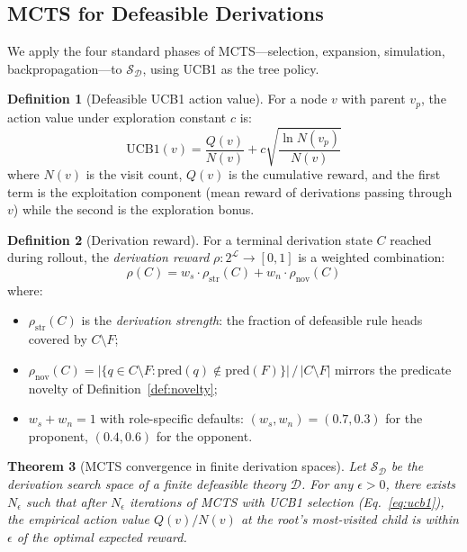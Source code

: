 \documentclass{article}
\newtheorem{theorem}{Theorem}[section]
\theoremstyle{definition}
\newtheorem{definition}[theorem]{Definition}
\newcommand{\D}{\mathcal{D}}
\newcommand{\La}{\mathcal{L}}
\newcommand{\pred}{\mathrm{pred}}
\newcommand{\SD}{\mathcal{S}_{\D}}
\newcommand{\UCB}{\mathrm{UCB1}}
\begin{document}
\subsection{MCTS for Defeasible Derivations}\label{subsec:mcts-defeasible}

We apply the four standard phases of MCTS---selection, expansion, simulation, backpropagation---to $\SD$, using UCB1 as the tree policy.

\begin{definition}[Defeasible UCB1 action value]
\label{def:ucb1-defeasible}
For a node $v$ with parent $v_p$, the action value under exploration constant $c$ is:
\begin{equation}\label{eq:ucb1}
  \UCB(v) = \frac{Q(v)}{N(v)} + c \sqrt{\frac{\ln N(v_p)}{N(v)}}
\end{equation}
where $N(v)$ is the visit count, $Q(v)$ is the cumulative reward, and the first term is the exploitation component (mean reward of derivations passing through $v$) while the second is the exploration bonus.
\end{definition}

\begin{definition}[Derivation reward]\label{def:deriv-reward}
For a terminal derivation state $C$ reached during rollout, the \emph{derivation reward} $\rho: 2^{\La} \to [0,1]$ is a weighted combination:
\begin{equation}\label{eq:deriv_reward}
  \rho(C) = w_s \cdot \rho_{\mathrm{str}}(C) + w_n \cdot \rho_{\mathrm{nov}}(C)
\end{equation}
where:
\begin{itemize}[nosep]
  \item $\rho_{\mathrm{str}}(C)$ is the \emph{derivation strength}: the fraction of defeasible rule heads covered by $C \setminus F$;
  \item $\rho_{\mathrm{nov}}(C) = |{\{q \in C \setminus F : \pred(q) \notin \pred(F)\}}| \,/\, |C \setminus F|$ mirrors the predicate novelty of Definition~\ref{def:novelty};
  \item $w_s + w_n = 1$ with role-specific defaults: $(w_s, w_n) = (0.7, 0.3)$ for the proponent, $(0.4, 0.6)$ for the opponent.
\end{itemize}
\end{definition}

\begin{theorem}[MCTS convergence in finite derivation spaces]
\label{thm:mcts-convergence}
Let $\SD$ be the derivation search space of a finite defeasible theory $\D$. For any $\epsilon > 0$, there exists $N_\epsilon$ such that after $N_\epsilon$ iterations of MCTS with UCB1 selection (Eq.~\ref{eq:ucb1}), the empirical action value $Q(v)/N(v)$ at the root's most-visited child is within $\epsilon$ of the optimal expected reward.
\end{theorem}
\end{document}
